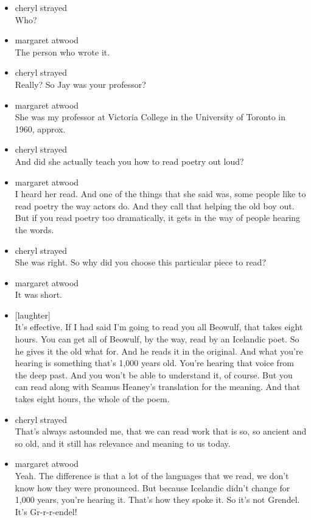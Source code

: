 \begin{itemize}
\item
  cheryl strayed\\
  Who?
\item
  margaret atwood\\
  The person who wrote it.
\item
  cheryl strayed\\
  Really? So Jay was your professor?
\item
  margaret atwood\\
  She was my professor at Victoria College in the University of Toronto
  in 1960, approx.
\item
  cheryl strayed\\
  And did she actually teach you how to read poetry out loud?
\item
  margaret atwood\\
  I heard her read. And one of the things that she said was, some people
  like to read poetry the way actors do. And they call that helping the
  old boy out. But if you read poetry too dramatically, it gets in the
  way of people hearing the words.
\item
  cheryl strayed\\
  She was right. So why did you choose this particular piece to read?
\item
  margaret atwood\\
  It was short.
\item
  {[}laughter{]}\\
  It's effective. If I had said I'm going to read you all Beowulf, that
  takes eight hours. You can get all of Beowulf, by the way, read by an
  Icelandic poet. So he gives it the old what for. And he reads it in
  the original. And what you're hearing is something that's 1,000 years
  old. You're hearing that voice from the deep past. And you won't be
  able to understand it, of course. But you can read along with Seamus
  Heaney's translation for the meaning. And that takes eight hours, the
  whole of the poem.
\item
  cheryl strayed\\
  That's always astounded me, that we can read work that is so, so
  ancient and so old, and it still has relevance and meaning to us
  today.
\item
  margaret atwood\\
  Yeah. The difference is that a lot of the languages that we read, we
  don't know how they were pronounced. But because Icelandic didn't
  change for 1,000 years, you're hearing it. That's how they spoke it.
  So it's not Grendel. It's Gr-r-r-endel!

\end{itemize}
